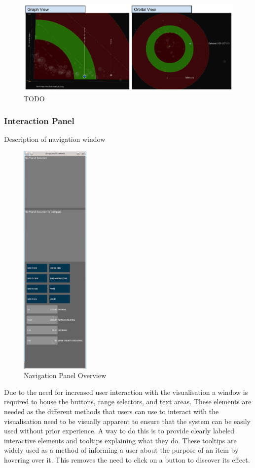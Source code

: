 \begin{figure}[H]
  \centering
      \includegraphics[width=1\textwidth]{images/habitable.png}
  \caption{TODO~}  
    \label{fig:habitable}
\end{figure}

\subsubsection{Interaction Panel}
Description of navigation window
\begin{figure}[H]
  \centering
      \includegraphics[width=0.3\textwidth]{images/nav.png}
  \caption{Navigation Panel Overview}
  \label{fig:nav}
\end{figure}

Due to the need for increased user interaction with the visualisation a window
is required to house the buttons, range selectors, and text areas. These
elements are needed as the different methods that users can use to interact with
the visualisation need to be visually apparent to ensure that the system can be
easily used without prior experience. A way to do this is to provide clearly
labeled interactive elements and tooltips explaining what they
do. These tooltips are widely used as a method of informing a
user about the purpose of an item by hovering over it. This removes the need to
click on a button to discover its effect.



